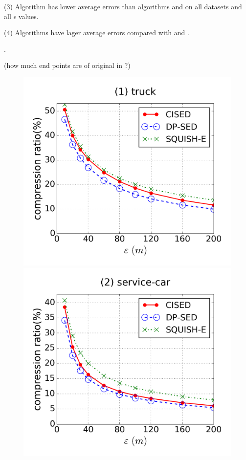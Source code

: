 \ni(3) Algorithm \squishe has lower average errors than algorithms \dpa and \cist on all datasets and all $\epsilon$ values.

\ni(4) Algorithms \cist have lager average errors compared with \dpa and \squishe.

.

\textcolor[rgb]{1.00,0.00,0.00}{(how much end points are of original in \cista?)}





\begin{figure}[tb!]
\centering
\includegraphics[scale = 0.24]{figures/Exp-cr-epsilon-truck.png}
\includegraphics[scale = 0.24]{figures/Exp-cr-epsilon-service.png}

\end{figure}
